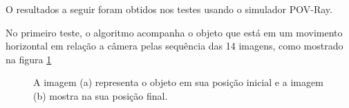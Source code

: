 O resultados a seguir foram obtidos nos testes usando o simulador POV-Ray.

No primeiro teste, o algoritmo acompanha o objeto que está em um movimento horizontal em relação a câmera
pelas sequência das 14 imagens, como mostrado na figura \ref{fig:imgpapercerta}

\begin{figure}[H]
\centering
  \caption{A imagem (a) representa o objeto em sua posição inicial  
   e a imagem (b) mostra na sua posição final.}
  \label{fig:imgpapercerta}
\end{figure}

